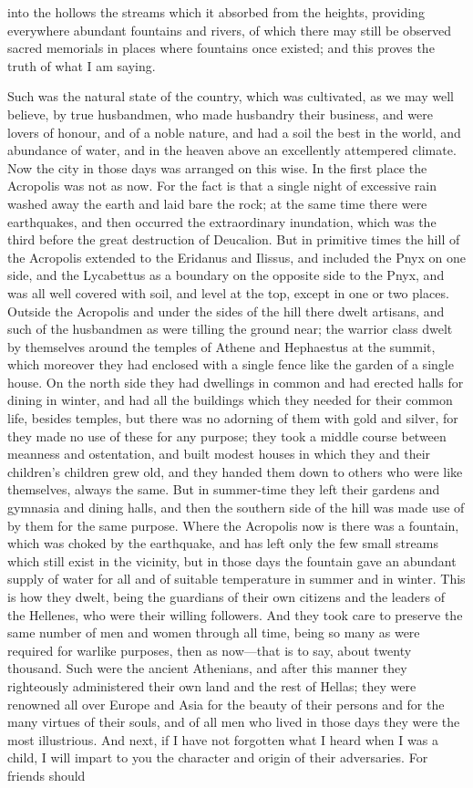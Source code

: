 \documentclass[11pt,letter]{article}
\begin{document}
into the hollows the streams which it absorbed from the heights, providing everywhere abundant fountains and rivers, of which there may still be observed sacred memorials in places where fountains once existed; and this proves the truth of what I am saying.

\par  Such was the natural state of the country, which was cultivated, as we may well believe, by true husbandmen, who made husbandry their business, and were lovers of honour, and of a noble nature, and had a soil the best in the world, and abundance of water, and in the heaven above an excellently attempered climate. Now the city in those days was arranged on this wise. In the first place the Acropolis was not as now. For the fact is that a single night of excessive rain washed away the earth and laid bare the rock; at the same time there were earthquakes, and then occurred the extraordinary inundation, which was the third before the great destruction of Deucalion. But in primitive times the hill of the Acropolis extended to the Eridanus and Ilissus, and included the Pnyx on one side, and the Lycabettus as a boundary on the opposite side to the Pnyx, and was all well covered with soil, and level at the top, except in one or two places. Outside the Acropolis and under the sides of the hill there dwelt artisans, and such of the husbandmen as were tilling the ground near; the warrior class dwelt by themselves around the temples of Athene and Hephaestus at the summit, which moreover they had enclosed with a single fence like the garden of a single house. On the north side they had dwellings in common and had erected halls for dining in winter, and had all the buildings which they needed for their common life, besides temples, but there was no adorning of them with gold and silver, for they made no use of these for any purpose; they took a middle course between meanness and ostentation, and built modest houses in which they and their children's children grew old, and they handed them down to others who were like themselves, always the same. But in summer-time they left their gardens and gymnasia and dining halls, and then the southern side of the hill was made use of by them for the same purpose. Where the Acropolis now is there was a fountain, which was choked by the earthquake, and has left only the few small streams which still exist in the vicinity, but in those days the fountain gave an abundant supply of water for all and of suitable temperature in summer and in winter. This is how they dwelt, being the guardians of their own citizens and the leaders of the Hellenes, who were their willing followers. And they took care to preserve the same number of men and women through all time, being so many as were required for warlike purposes, then as now—that is to say, about twenty thousand. Such were the ancient Athenians, and after this manner they righteously administered their own land and the rest of Hellas; they were renowned all over Europe and Asia for the beauty of their persons and for the many virtues of their souls, and of all men who lived in those days they were the most illustrious. And next, if I have not forgotten what I heard when I was a child, I will impart to you the character and origin of their adversaries. For friends should 
\end{document}
